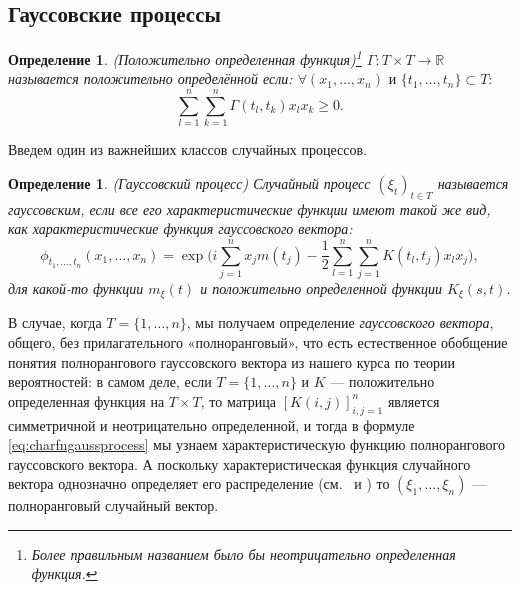 \documentclass[10pt]{article}
\newtheorem{defn}[thm]{Определение}
\theoremstyle{boldnormal}
\theoremstyle{boldremark}
\begin{document}
\subsection{Гауссовские процессы}\label{subsection:gaussproc}
\begin{defn}(Положительно определенная функция)\footnote{Более правильным названием было бы
\emph{неотрицательно определенная} функция.}
$\Gamma: T \times T \rightarrow \mathbb{R}$ называется положительно определённой если: $\forall (x_1, \dots, x_n) \text{ и } \{t_1, \dots, t_n\} \subset T:$
$$ \sum_{l=1}^n \sum_{k=1}^n \Gamma(t_l, t_k) x_l x_k \geq 0. $$
\end{defn}

Введем один из важнейших классов случайных процессов.
\begin{defn}\label{defn:gaussproc}(Гауссовский процесс) Случайный процесс $(\xi_t)_{t \in T}$ называется \emph{гауссовским}, если все его характеристические функции имеют такой же вид, как характеристические функция гауссовского вектора:
\begin{equation}
\label{eq:charfngaussprocess}
\phi_{t_1,\dots,t_n}(x_1,\dots,x_n) =
\exp\Biggl(
i \sum_{j=1}^n x_j m(t_j)
- \frac{1}{2} \sum_{l=1}^n \sum_{j=1}^n K(t_l, t_j) x_l x_j
\Biggr),
\end{equation}
для какой-то функции \(m_{\xi}(t)\) и положительно определенной
функции \(K_{\xi}(s,t)\).
\end{defn}
В случае, когда \(T=\{1,\ldots,n\}\), мы получаем
определение \textit{гауссовского вектора}, общего, без 
прилагательного «полноранговый», что есть естественное 
обобщение понятия полнорангового гауссовского вектора из
нашего курса по теории вероятностей: в самом деле, если 
\(T=\{1,\ldots,n\}\) и 
\(K\) --- положительно определенная функция на \(T\times T\),
то 
матрица \([K(i,j)]_{i,j=1}^n\) является симметричной и
неотрицательно определенной, и тогда в 
формуле \eqref{eq:charfngaussprocess} мы узнаем 
характеристическую функцию полнорангового гауссовского 
вектора. А поскольку характеристическая функция 
случайного вектора однозначно определяет
его распределение
(см.~\cite[II-12-Теорема 3]{shiryaev-rus}
и \cite[II-12-Задача 3]{shiryaev-rus})
то \((\xi_1,\ldots,\xi_n)\) --- полноранговый случайный
вектор.
\end{document}
